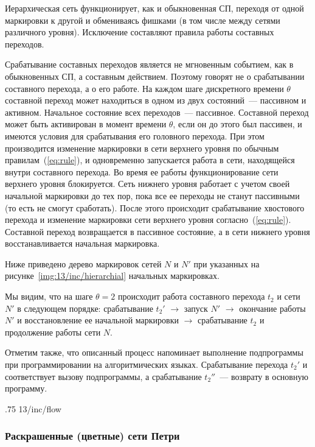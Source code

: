 Иерархическая сеть функционирует, как и обыкновенная СП, переходя от одной маркировки к другой и обмениваясь фишками (в том числе между сетями различного уровня). Исключение составляют правила работы составных переходов.

Срабатывание составных переходов является не мгновенным событием, как в обыкновенных СП, а составным действием. Поэтому говорят не о срабатывании составного перехода, а о его работе. На каждом шаге дискретного времени $\theta$ составной переход может находиться в одном из двух состояний~--- пассивном и активном. Начальное состояние всех переходов~--- пассивное. Составной переход может быть активирован в момент времени $\theta$, если он до этого был пассивен, и имеются условия для срабатывания его головного перехода. При этом производится изменение маркировки в сети верхнего уровня по обычным правилам~(\ref{eq:rule}), и одновременно запускается работа в сети, находящейся внутри составного перехода. Во время ее работы функционирование сети верхнего уровня блокируется. Сеть нижнего уровня работает с учетом своей начальной маркировки до тех пор, пока все ее переходы не станут пассивными (то есть не смогут сработать). После этого происходит срабатывание хвостового перехода и изменение маркировки сети верхнего уровня согласно~(\ref{eq:rule}). Составной переход возвращается в пассивное состояние, а в сети нижнего уровня восстанавливается начальная маркировка.

Ниже приведено дерево маркировок сетей $N$ и $N'$ при указанных на рисунке~\ref{img:13/inc/hierarchial} начальных маркировках.

Мы видим, что на шаге ${\theta = 2}$ происходит работа составного перехода $t_2$ и сети $N'$ в следующем порядке: срабатывание $t_2'$ $\rightarrow$ запуск $N'$ $\rightarrow$ окончание работы $N'$ и восстановление ее начальной маркировки $\rightarrow$ срабатывание $t_2$ и продолжение работы сети $N$.

Отметим также, что описанный процесс напоминает выполнение подпрограммы при программировании на алгоритмических языках. Срабатывание перехода $t_2'$ и соответствует вызову подпрограммы, а срабатывание $t_2''$~--- возврату в основную программу.

\image
{.75\textwidth}
{13/inc/flow}
{}

\subsubsection{Раскрашенные (цветные) сети Петри} 

